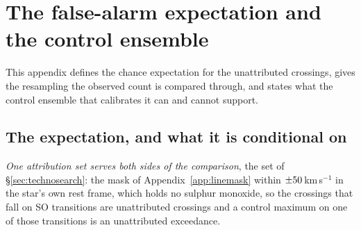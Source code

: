 \section{The false-alarm expectation and the control ensemble}
\label{app:falsealarm}

This appendix defines the chance expectation for the unattributed crossings,
gives the resampling the observed count is compared through, and states what
the control ensemble that calibrates it can and cannot support.

\subsection{The expectation, and what it is conditional on}

\emph{One attribution set serves both sides of the comparison}, the set of
\S\ref{sec:technosearch}: the mask of Appendix~\ref{app:linemask} within
$\pm50$\,km\,s$^{-1}$ in the star's own rest frame, which holds no
sulphur monoxide, so the \SoNCrossWord{} crossings that fall on SO
transitions are unattributed crossings and a control maximum on one of those
transitions is an unattributed exceedance.


